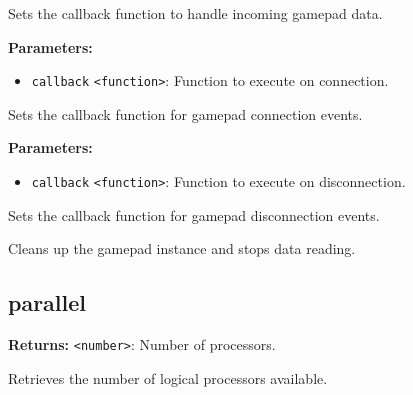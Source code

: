 \documentclass[12pt,a4paper]{article}
\begin{document}
\noindent Sets the callback function to handle incoming gamepad data.

\vspace{5mm}
\noindent {}


\noindent \textbf{Parameters:}
\begin{itemize}
  \item \texttt{callback} \texttt{<function>}: Function to execute on connection.
\end{itemize}

\noindent Sets the callback function for gamepad connection events.

\vspace{5mm}
\noindent {}


\noindent \textbf{Parameters:}
\begin{itemize}
  \item \texttt{callback} \texttt{<function>}: Function to execute on disconnection.
\end{itemize}

\noindent Sets the callback function for gamepad disconnection events.

\vspace{5mm}
\noindent {}


\noindent Cleans up the gamepad instance and stops data reading.


\subsection{parallel}
\vspace{5mm}
\noindent {}


\noindent \textbf{Returns:} \texttt{<number>}: Number of processors.

\noindent Retrieves the number of logical processors available.

\vspace{5mm}
\noindent {}
\end{document}

